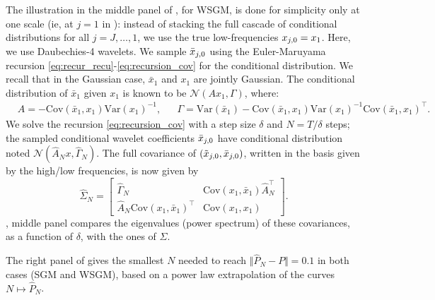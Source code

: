 \documentclass{article}
\begin{document}
The illustration in the middle panel of , for WSGM, is done for simplicity only at one scale (ie, at $j=1$ in ): instead of stacking the full cascade of conditional distributions for all $j=J, \dotsc, 1$, we use the true low-frequencies $x_{j,0} = x_1$. Here, we use Daubechies-4 wavelets. We sample ${\bar x}_{j,0}$ using the Euler-Maruyama recursion \eqref{eq:recur_recu}-\eqref{eq:recursion_cov} for the conditional distribution. We recall that in the Gaussian case, $\bar{x}_1$ and $x_1$ are jointly Gaussian. The conditional distribution of $\bar{x}_1$ given $x_1$ is known to be $\mathcal{N}(Ax_1, \Gamma)$, where:
\begin{align}
    &A = - \mathrm{Cov}(\bar{x}_1, x_1)\mathrm{Var}(x_1)^{-1}, && \Gamma = \mathrm{Var}(\bar{x}_1) - \mathrm{Cov}(\bar{x}_1, x_1)\mathrm{Var}(x_1)^{-1}\mathrm{Cov}(\bar{x}_1, x_1)^\top.
\end{align}
We solve the recursion \eqref{eq:recursion_cov} with a step size $\delta$ and $N = T/\delta$ steps; the sampled conditional wavelet coefficients ${\bar x}_{j,0}$ have conditional distribution noted $\mathcal{N}(\hat{A}_N x, \hat{\Gamma}_N)$. The full covariance of $(\tilde{x}_{j,0}, {\bar x}_{j,0})$, written in the basis given by the high/low frequencies, is now given by
$$ \hat{\Sigma}_N = \begin{bmatrix}\hat{\Gamma}_N & \mathrm{Cov}(x_1, \bar{x}_1)\hat{A}_N^\top \\ \hat{A}_N \mathrm{Cov}(x_1, \bar{x}_1)^\top & \mathrm{Cov}(x_1, x_1) \end{bmatrix}.$$
, middle panel compares the eigenvalues (power spectrum) of these covariances, as a function of $\delta$, with the ones of $\Sigma$. 

The right panel of  gives the smallest $N$ needed to reach $\Vert \hat{P}_N - P \Vert = 0.1$ in both cases (SGM and WSGM), based on a power law extrapolation of the curves $N\mapsto \hat{P}_N$. 
\end{document}
